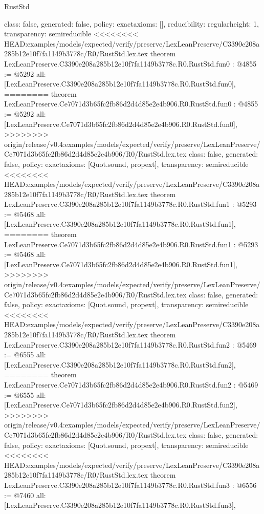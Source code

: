 \begin{lexlean}{RustStd}
\begin{coremodule}
{\begin{coremodule}
{{{  class: false,
  generated: false,
  policy: exact{axioms: []},
  reducibility: regular{height: 1},
  transparency: semireducible
}
<<<<<<<< HEAD:examples/models/expected/verify/preserve/LexLeanPreserve/C3390e208a285b12e10f7fa1149b3778c/R0/RustStd.lex.tex
theorem LexLeanPreserve.C3390e208a285b12e10f7fa1149b3778c.R0.RustStd.fun0 : @4855 := @5292 {
  all: [LexLeanPreserve.C3390e208a285b12e10f7fa1149b3778c.R0.RustStd.fun0],
========
theorem LexLeanPreserve.Ce7071d3b65fc2fb86d2d4d85e2e4b906.R0.RustStd.fun0 : @4855 := @5292 {
  all: [LexLeanPreserve.Ce7071d3b65fc2fb86d2d4d85e2e4b906.R0.RustStd.fun0],
>>>>>>>> origin/release/v0.4:examples/models/expected/verify/preserve/LexLeanPreserve/Ce7071d3b65fc2fb86d2d4d85e2e4b906/R0/RustStd.lex.tex
  class: false,
  generated: false,
  policy: exact{axioms: [Quot.sound, propext]},
  transparency: semireducible
}
<<<<<<<< HEAD:examples/models/expected/verify/preserve/LexLeanPreserve/C3390e208a285b12e10f7fa1149b3778c/R0/RustStd.lex.tex
theorem LexLeanPreserve.C3390e208a285b12e10f7fa1149b3778c.R0.RustStd.fun1 : @5293 := @5468 {
  all: [LexLeanPreserve.C3390e208a285b12e10f7fa1149b3778c.R0.RustStd.fun1],
========
theorem LexLeanPreserve.Ce7071d3b65fc2fb86d2d4d85e2e4b906.R0.RustStd.fun1 : @5293 := @5468 {
  all: [LexLeanPreserve.Ce7071d3b65fc2fb86d2d4d85e2e4b906.R0.RustStd.fun1],
>>>>>>>> origin/release/v0.4:examples/models/expected/verify/preserve/LexLeanPreserve/Ce7071d3b65fc2fb86d2d4d85e2e4b906/R0/RustStd.lex.tex
  class: false,
  generated: false,
  policy: exact{axioms: [Quot.sound, propext]},
  transparency: semireducible
}
<<<<<<<< HEAD:examples/models/expected/verify/preserve/LexLeanPreserve/C3390e208a285b12e10f7fa1149b3778c/R0/RustStd.lex.tex
theorem LexLeanPreserve.C3390e208a285b12e10f7fa1149b3778c.R0.RustStd.fun2 : @5469 := @6555 {
  all: [LexLeanPreserve.C3390e208a285b12e10f7fa1149b3778c.R0.RustStd.fun2],
========
theorem LexLeanPreserve.Ce7071d3b65fc2fb86d2d4d85e2e4b906.R0.RustStd.fun2 : @5469 := @6555 {
  all: [LexLeanPreserve.Ce7071d3b65fc2fb86d2d4d85e2e4b906.R0.RustStd.fun2],
>>>>>>>> origin/release/v0.4:examples/models/expected/verify/preserve/LexLeanPreserve/Ce7071d3b65fc2fb86d2d4d85e2e4b906/R0/RustStd.lex.tex
  class: false,
  generated: false,
  policy: exact{axioms: [Quot.sound, propext]},
  transparency: semireducible
}
<<<<<<<< HEAD:examples/models/expected/verify/preserve/LexLeanPreserve/C3390e208a285b12e10f7fa1149b3778c/R0/RustStd.lex.tex
theorem LexLeanPreserve.C3390e208a285b12e10f7fa1149b3778c.R0.RustStd.fun3 : @6556 := @7460 {
  all: [LexLeanPreserve.C3390e208a285b12e10f7fa1149b3778c.R0.RustStd.fun3],
}}}}}}
\end{coremodule}}
\end{coremodule}
\end{lexlean}
